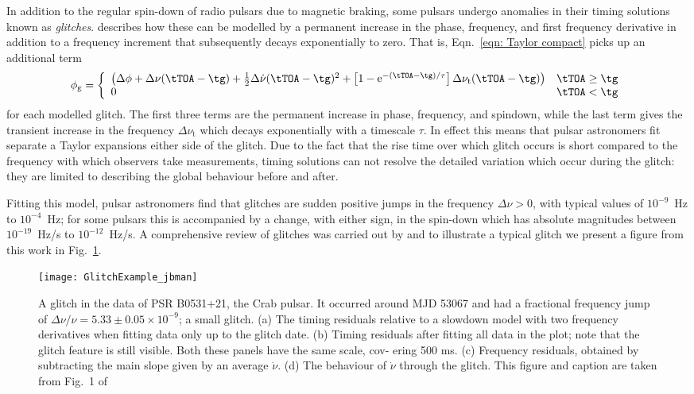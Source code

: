 In addition to the regular spin-down of radio pulsars due to magnetic braking, some
pulsars undergo anomalies in their timing solutions known as \emph{glitches}.
\citet{Edwards2006} describes how these can be modelled by a permanent increase
in the phase, frequency, and first frequency derivative in addition to a
frequency increment that subsequently decays exponentially to zero. That is,
Eqn.~\eqref{eqn: Taylor compact} picks up an additional term
\begin{align}
\phi_{\textrm{g}} = \left\{
\begin{array}{ll}
\left( \Delta\phi + \Delta\nu(\tTOA - \tg) + \frac{1}{2}\Delta\dot{\nu}(\tTOA - \tg)^{2}
+ \left[1-\textrm{e}^{-(\tTOA - \tg)/\tau}\right]\Delta\nu_{\textrm{t}}(\tTOA - \tg)\right)
& \tTOA \ge \tg \\
0 & \tTOA < \tg
\end{array}
\right.
\label{eqn: glitch timing model}
\end{align}
for each modelled glitch. The first three terms are the permanent increase
in phase, frequency, and spindown, while the last term gives the transient
increase in the frequency $\Delta\nu_{\textrm{t}}$ which decays exponentially
with a timescale $\tau$. In effect this means that pulsar astronomers fit
separate a Taylor expansions either side of the glitch. Due to the fact that
the rise time over which glitch occurs is short compared to the frequency
with which observers take measurements, timing solutions can not resolve the
detailed variation which occur during the glitch: they are limited to describing
the global behaviour before and after.

Fitting this model, pulsar astronomers find that glitches are sudden positive
jumps in the frequency $\Delta\nu > 0$, with typical values of $10^{-9}$~Hz to
$10^{-4}$~Hz; for some pulsars this is accompanied by a change, with either
sign, in the spin-down which has absolute magnitudes between $10^{-19}$~Hz/s to
$10^{-12}$~Hz/s. A comprehensive review of glitches was carried out by
\citet{Espinoza2011} and to illustrate a typical glitch we present a figure
from this work in Fig.~\ref{fig: glitch}.
\begin{figure}[htb]
    \centering
    \texttt{[image: GlitchExample\_jbman]}
    \caption{
A glitch in the data of PSR B0531+21, the Crab pulsar. It occurred around MJD
53067 and had a fractional frequency jump of $\Delta\nu/\nu = 5.33 \pm 0.05
\times 10^{−9}$; a small glitch. (a) The timing residuals relative to a
slowdown model with two frequency derivatives when fitting data only up to the
glitch date. (b) Timing residuals after fitting all data in the plot; note
that the glitch feature is still visible. Both these panels have the same
scale, cov- ering 500 ms. (c) Frequency residuals, obtained by subtracting the
main slope given by an average $\dot\nu$.  (d) The behaviour of $\dot\nu$
through the glitch. This figure and caption are taken from Fig.~1 of
\citet{Espinoza2011}}
    \label{fig: glitch}
\end{figure}

